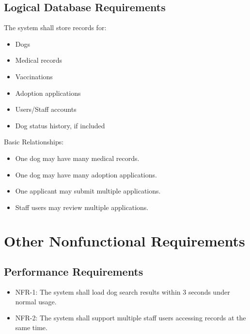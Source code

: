 \documentclass[12pt]{article}
\begin{document}
\subsection{Logical Database Requirements}
The system shall store records for:
\begin{itemize}\item Dogs\end{itemize}
\begin{itemize}\item Medical records\end{itemize}
\begin{itemize}\item Vaccinations\end{itemize}
\begin{itemize}\item Adoption applications\end{itemize}
\begin{itemize}\item Users/Staff accounts\end{itemize}
\begin{itemize}\item Dog status history, if included\end{itemize}
Basic Relationships:
\begin{itemize}\item One dog may have many medical records.\end{itemize}
\begin{itemize}\item One dog may have many adoption applications.\end{itemize}
\begin{itemize}\item One applicant may submit multiple applications.\end{itemize}
\begin{itemize}\item Staff users may review multiple applications.\end{itemize}
\section{Other Nonfunctional Requirements}
\subsection{Performance Requirements}
\begin{itemize}\item NFR-1: The system shall load dog search results within 3 seconds under normal usage.\end{itemize}
\begin{itemize}\item NFR-2: The system shall support multiple staff users accessing records at the same time.\end{itemize}
\end{document}

